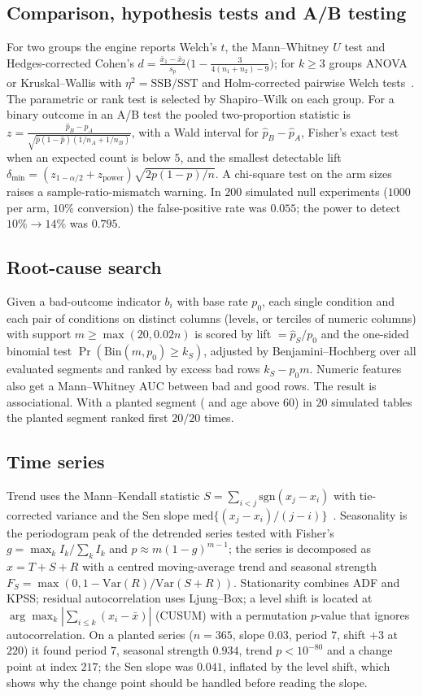 \documentclass[conference]{IEEEtran}
\begin{document}
\subsection{Comparison, hypothesis tests and A/B testing}
For two groups the engine reports Welch's $t$, the Mann--Whitney $U$ test and Hedges-corrected Cohen's $d=\frac{\bar x_1-\bar x_2}{s_p}\big(1-\frac{3}{4(n_1+n_2)-9}\big)$; for $k\ge3$ groups ANOVA or Kruskal--Wallis with $\eta^2=\mathrm{SSB}/\mathrm{SST}$ and Holm-corrected pairwise Welch tests~\cite{holm1979}. The parametric or rank test is selected by Shapiro--Wilk on each group. For a binary outcome in an A/B test the pooled two-proportion statistic is $z=\frac{\hat p_B-\hat p_A}{\sqrt{\hat p(1-\hat p)(1/n_A+1/n_B)}}$, with a Wald interval for $\hat p_B-\hat p_A$, Fisher's exact test when an expected count is below $5$, and the smallest detectable lift $\delta_{\min}=(z_{1-\alpha/2}+z_{\mathrm{power}})\sqrt{2p(1-p)/n}$. A chi-square test on the arm sizes raises a sample-ratio-mismatch warning. In $200$ simulated null experiments ($1000$ per arm, $10\%$ conversion) the false-positive rate was $0.055$; the power to detect $10\%\to14\%$ was $0.795$.
\subsection{Root-cause search}
Given a bad-outcome indicator $b_i$ with base rate $p_0$, each single condition and each pair of conditions on distinct columns (levels, or terciles of numeric columns) with support $m\ge\max(20,0.02n)$ is scored by lift $=\hat p_S/p_0$ and the one-sided binomial test $\Pr(\mathrm{Bin}(m,p_0)\ge k_S)$, adjusted by Benjamini--Hochberg over all evaluated segments and ranked by excess bad rows $k_S-p_0m$. Numeric features also get a Mann--Whitney AUC between bad and good rows. The result is associational. With a planted segment ( and age above $60$) in $20$ simulated tables the planted segment ranked first $20/20$ times.
\subsection{Time series}
Trend uses the Mann--Kendall statistic $S=\sum_{i<j}\mathrm{sgn}(x_j-x_i)$ with tie-corrected variance and the Sen slope $\mathrm{med}\{(x_j-x_i)/(j-i)\}$~\cite{mann1945,sen1968}. Seasonality is the periodogram peak of the detrended series tested with Fisher's $g=\max_k I_k/\sum_k I_k$ and $p\approx m(1-g)^{m-1}$; the series is decomposed as $x=T+S+R$ with a centred moving-average trend and seasonal strength $F_S=\max(0,1-\mathrm{Var}(R)/\mathrm{Var}(S+R))$. Stationarity combines ADF and KPSS; residual autocorrelation uses Ljung--Box; a level shift is located at $\arg\max_k|\sum_{i\le k}(x_i-\bar x)|$ (CUSUM) with a permutation $p$-value that ignores autocorrelation. On a planted series ($n=365$, slope $0.03$, period $7$, shift $+3$ at $220$) it found period $7$, seasonal strength $0.934$, trend $p<10^{-80}$ and a change point at index $217$; the Sen slope was $0.041$, inflated by the level shift, which shows why the change point should be handled before reading the slope.
\end{document}
